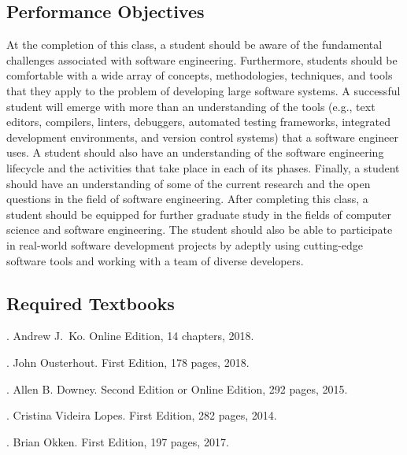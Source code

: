\documentclass[11pt]{article}
\begin{document}
\subsection*{Performance Objectives}

At the completion of this class, a student should be aware of the fundamental
challenges associated with software engineering. Furthermore, students should
be comfortable with a wide array of concepts, methodologies, techniques, and
tools that they apply to the problem of developing large software systems. A
successful student will emerge with more than an understanding of the tools
(e.g., text editors, compilers, linters, debuggers, automated testing
frameworks, integrated development environments, and version control systems)
that a software engineer uses. A student should also have an understanding of
the software engineering lifecycle and the activities that take place in each
of its phases. Finally, a student should have an understanding of some of the
current research and the open questions in the field of software engineering.
After completing this class, a student should be equipped for further graduate
study in the fields of computer science and software engineering. The student
should also be able to participate in real-world software development projects
by adeptly using cutting-edge software tools and working with a team of diverse
developers.

\subsection*{Required Textbooks}

. Andrew J.\ Ko.
Online Edition, 14 chapters, 2018.
%
\vspace*{.5em}

. John Ousterhout.
First Edition, 178 pages, 2018.
%
\vspace*{.5em}

. Allen B. Downey.
Second Edition or Online Edition, 292 pages, 2015.
%
\vspace*{.5em}

. Cristina Videira Lopes.
First Edition, 282 pages, 2014.
%
\vspace*{.5em}

. Brian Okken.
First Edition, 197 pages, 2017.
%
\vspace*{.5em}
\end{document}
